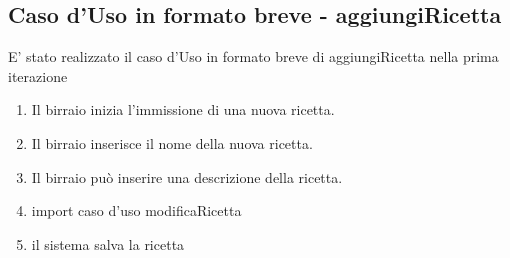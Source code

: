 \documentclass[a4paper,12pt]{report}
\begin{document}
		\subsection{Caso d'Uso in formato breve - aggiungiRicetta}
			E' stato realizzato il caso d'Uso in formato breve di aggiungiRicetta nella prima iterazione
			\begin{enumerate}
    				\item Il birraio inizia l'immissione di una nuova ricetta.
    				\item Il birraio inserisce il nome della nuova ricetta.
				\item Il birraio può inserire una descrizione della ricetta.
    				\item import caso d'uso modificaRicetta
    				\item il sistema salva la ricetta		
			\end{enumerate}		
	
\end{document}
